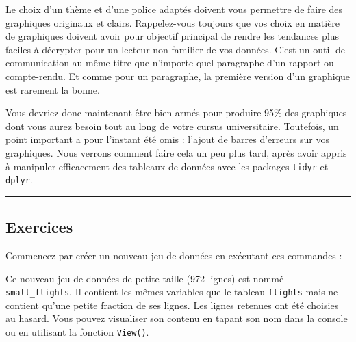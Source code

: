 \documentclass[a4paperpaper,]{article}
\newenvironment{Shaded}{\begin{snugshade}}{\end{snugshade}}
\newcommand{\KeywordTok}[1]{\textcolor[rgb]{0.13,0.29,0.53}{\textbf{#1}}}
\newcommand{\DecValTok}[1]{\textcolor[rgb]{0.00,0.00,0.81}{#1}}
\newcommand{\StringTok}[1]{\textcolor[rgb]{0.31,0.60,0.02}{#1}}
\newcommand{\OperatorTok}[1]{\textcolor[rgb]{0.81,0.36,0.00}{\textbf{#1}}}
\newcommand{\NormalTok}[1]{#1}
\theoremstyle{definition}
\theoremstyle{definition}
\theoremstyle{definition}
\theoremstyle{remark}
\begin{document}
Le choix d'un thème et d'une police adaptés doivent vous permettre de
faire des graphiques originaux et clairs. Rappelez-vous toujours que vos
choix en matière de graphiques doivent avoir pour objectif principal de
rendre les tendances plus faciles à décrypter pour un lecteur non
familier de vos données. C'est un outil de communication au même titre
que n'importe quel paragraphe d'un rapport ou compte-rendu. Et comme
pour un paragraphe, la première version d'un graphique est rarement la
bonne.

Vous devriez donc maintenant être bien armés pour produire 95\% des
graphiques dont vous aurez besoin tout au long de votre cursus
universitaire. Toutefois, un point important a pour l'instant été omis :
l'ajout de barres d'erreurs sur vos graphiques. Nous verrons comment
faire cela un peu plus tard, après avoir appris à manipuler efficacement
des tableaux de données avec les packages \texttt{tidyr} et
\texttt{dplyr}.

\begin{center}\rule{0.5\linewidth}{\linethickness}\end{center}

\subsection{Exercices}\label{exercices-6}

Commencez par créer un nouveau jeu de données en exécutant ces commandes
:

\begin{Shaded}
\end{Shaded}

Ce nouveau jeu de données de petite taille (972 lignes) est nommé
\texttt{small\_flights}. Il contient les mêmes variables que le tableau
\texttt{flights} mais ne contient qu'une petite fraction de ses lignes.
Les lignes retenues ont été choisies au hasard. Vous pouvez visualiser
son contenu en tapant son nom dans la console ou en utilisant la
fonction \texttt{View()}.
\end{document}
